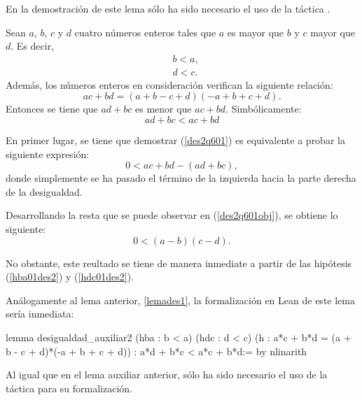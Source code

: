 En la demostración de este lema sólo ha sido necesario el uso de la táctica
.

\begin{lema}\label{lemades2}
  Sean \(a\), \(b\), \(c\) y \(d\) cuatro números enteros tales que \(a\) es
  mayor que \(b\) y \(c\) mayor que \(d\). Es decir, 
  \begin{align}
    &b<a,\tag{hba}\label{hba01des2}\\
    &d<c.\tag{hdc}\label{hdc01des2}
  \end{align}
  Además, los números enteros en consideración verifican la siguiente relación:
    \begin{equation}\tag{h}
      ac+bd = (a+b-c+d)(-a+b+c+d).
    \end{equation}
    Entonces se tiene que \(ad+bc\) es menor que \(ac+bd\). Simbólicamente:
    \begin{equation}\label{des2q601}
      ad+bc<ac+bd
    \end{equation}
\end{lema}

\begin{demostracion}
  En primer lugar, se tiene que demostrar (\ref{des2q601}) es equivalente a
  probar la siguiente expresión:
  \begin{equation}\label{des2q601obj}
      0<ac+bd-(ad+bc),
  \end{equation}
  donde simplemente se ha pasado el término de la izquierda hacia la parte
  derecha de la desigualdad.

  Desarrollando la resta que se puede observar en (\ref{des2q601obj}), se
  obtiene lo siguiente:
  \begin{equation}
    0<(a-b)(c-d).
  \end{equation}

  No obstante, este reultado se tiene de manera inmediate a partir de las
  hipótesis (\ref{hba01des2}) y (\ref{hdc01des2}).
\end{demostracion}

Análogamente al lema anterior, \ref{lemades1}, la formalización en Lean de
este lema sería inmediata:
\begin{leancode}
lemma desigualdad_auxiliar2
  (hba : b < a)
  (hdc : d < c)
  (h : a*c + b*d = (a + b - c + d)*(-a + b + c + d))
  : a*d + b*c < a*c + b*d:=
by nlinarith
\end{leancode}

Al igual que en el lema auxiliar anterior, sólo ha sido necesario el uso de
la táctica  para su formalización.

